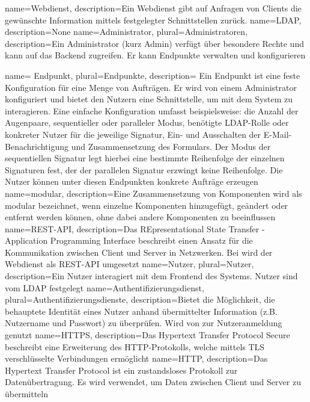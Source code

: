 {
	name=Webdienst,
	description={Ein Webdienst gibt auf Anfragen von Clients die gewünschte Information mittels festgelegter Schnittstellen zurück.}
}
{
	name=LDAP,
	description={None}
}
{
	name=Administrator,
	plural=Administratoren,
	description={Ein Administrator (kurz Admin) verfügt über besondere Rechte und kann auf das Backend zugreifen. Er kann Endpunkte verwalten und konfigurieren}
}

{
	name= Endpunkt,
	plural=Endpunkte,
	description={ Ein Endpunkt ist eine feste Konfiguration für eine Menge von Aufträgen. Er wird von einem Administrator konfiguriert und bietet den Nutzern eine Schnittstelle, um mit dem System zu interagieren. Eine einfache Konfiguration umfasst beispielsweise: die Anzahl der Augenpaare, sequentieller oder paralleler Modus, benötigte LDAP-Rolle oder konkreter Nutzer für die jeweilige Signatur, Ein- und Ausschalten der E-Mail-Benachrichtigung und Zusammensetzung des Formulars. Der Modus der sequentiellen Signatur legt hierbei eine bestimmte Reihenfolge der einzelnen Signaturen fest, der der parallelen Signatur erzwingt keine Reihenfolge. Die Nutzer können unter diesen Endpunkten konkrete Aufträge erzeugen}
}
{
	name=modular,
	description={Eine Zusammensetzung von Komponenten wird als modular bezeichnet, wenn einzelne Komponenten hinzugefügt, geändert oder entfernt werden können, ohne dabei andere Komponenten zu beeinflussen}
}
{
	name=REST-API,
	description={Das REpresentational State Transfer - Application Programming Interface beschreibt einen Ansatz für die Kommunikation zwischen Client und Server in Netzwerken. Bei \name wird der Webdienst als REST-API umgesetzt}
}
{
	name=Nutzer,
	plural=Nutzer,
	description={Ein Nutzer interagiert mit dem Frontend des Systems. Nutzer sind vom LDAP festgelegt}
}
{
	name=Authentifizierungsdienst,
	plural=Authentifizierungsdienste,
	description={Bietet die Möglichkeit, die behauptete Identität eines Nutzer anhand übermittelter Information (z.B. Nutzername und Passwort) zu überprüfen. Wird von \name zur Nutzeranmeldung genutzt}
}
{
	name=HTTPS,
	description={Das Hypertext Transfer Protocol Secure beschreibt eine Erweiterung des HTTP-Protokolls, welche mittels TLS verschlüsselte Verbindungen ermöglicht}
}
{
	name=HTTP,
	description={Das Hypertext Transfer Protocol ist ein zustandsloses Protokoll zur Datenübertragung. Es wird verwendet, um Daten zwischen Client und Server zu übermitteln}
}
